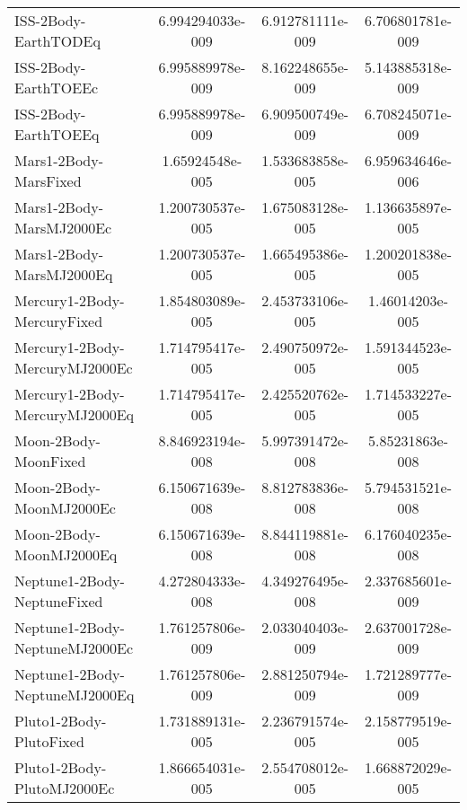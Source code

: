 \begin{table}[htbp!]
\begin{tabular}{lccc}
         ISS-2Body-EarthTODEq & 6.994294033e-009 & 6.912781111e-009 & 6.706801781e-009 \\
         ISS-2Body-EarthTOEEc & 6.995889978e-009 & 8.162248655e-009 & 5.143885318e-009 \\
         ISS-2Body-EarthTOEEq & 6.995889978e-009 & 6.909500749e-009 & 6.708245071e-009 \\
         Mars1-2Body-MarsFixed & 1.65924548e-005 & 1.533683858e-005 & 6.959634646e-006 \\
         Mars1-2Body-MarsMJ2000Ec & 1.200730537e-005 & 1.675083128e-005 & 1.136635897e-005 \\
         Mars1-2Body-MarsMJ2000Eq & 1.200730537e-005 & 1.665495386e-005 & 1.200201838e-005 \\
         Mercury1-2Body-MercuryFixed & 1.854803089e-005 & 2.453733106e-005 & 1.46014203e-005 \\
         Mercury1-2Body-MercuryMJ2000Ec & 1.714795417e-005 & 2.490750972e-005 & 1.591344523e-005 \\
         Mercury1-2Body-MercuryMJ2000Eq & 1.714795417e-005 & 2.425520762e-005 & 1.714533227e-005 \\
         Moon-2Body-MoonFixed & 8.846923194e-008 & 5.997391472e-008 & 5.85231863e-008 \\
         Moon-2Body-MoonMJ2000Ec & 6.150671639e-008 & 8.812783836e-008 & 5.794531521e-008 \\
         Moon-2Body-MoonMJ2000Eq & 6.150671639e-008 & 8.844119881e-008 & 6.176040235e-008 \\
         Neptune1-2Body-NeptuneFixed & 4.272804333e-008 & 4.349276495e-008 & 2.337685601e-009 \\
         Neptune1-2Body-NeptuneMJ2000Ec & 1.761257806e-009 & 2.033040403e-009 & 2.637001728e-009 \\
         Neptune1-2Body-NeptuneMJ2000Eq & 1.761257806e-009 & 2.881250794e-009 & 1.721289777e-009 \\
         Pluto1-2Body-PlutoFixed & 1.731889131e-005 & 2.236791574e-005 & 2.158779519e-005 \\
         Pluto1-2Body-PlutoMJ2000Ec & 1.866654031e-005 & 2.554708012e-005 & 1.668872029e-005 \\

\end{tabular}
\end{table}
